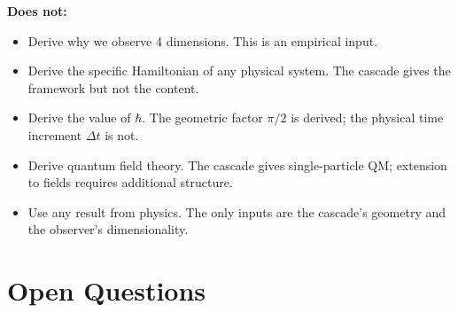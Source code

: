 \documentclass[12pt,a4paper]{article}
\begin{document}
\textbf{Does not:}
\begin{itemize}
\item Derive why we observe 4 dimensions. This is an empirical input.
\item Derive the specific Hamiltonian of any physical system. The cascade gives the
framework but not the content.
\item Derive the value of $\hbar$. The geometric factor $\pi/2$ is derived; the physical
time increment $\Delta t$ is not.
\item Derive quantum field theory. The cascade gives single-particle QM; extension to fields
requires additional structure.
\item Use any result from physics. The only inputs are the cascade's geometry and the
observer's dimensionality.
\end{itemize}

\section{Open Questions}
\label{sec:open}
\end{document}
